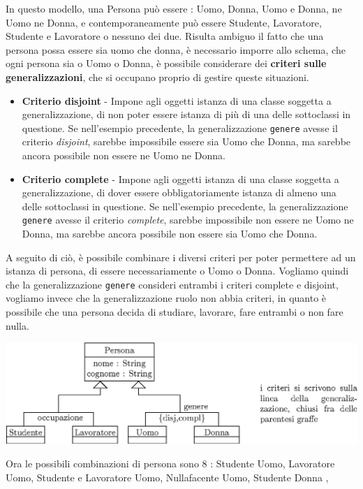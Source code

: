 \documentclass[12pt, letterpaper]{article}
\newcommand{\code}[1]{\colorbox{light-gray}{\texttt{#1}}}
\begin{document}
In questo modello, una Persona può essere : Uomo, Donna, Uomo e Donna, ne Uomo ne Donna, e contemporaneamente 
può essere Studente, Lavoratore, Studente e Lavoratore o nessuno dei due. Risulta ambiguo il fatto che una persona 
possa essere sia uomo che donna, è necessario imporre allo schema, che ogni persona sia o Uomo o Donna, è possibile 
considerare dei \textbf{criteri sulle generalizzazioni}, che si occupano proprio di gestire queste situazioni.\begin{itemize}
    \item \textbf{Criterio disjoint} - Impone agli oggetti istanza di una classe soggetta a generalizzazione, di non poter 
    essere istanza di più di una delle sottoclassi in questione. Se nell'esempio precedente, la generalizzazione 
    \code{genere} avesse il criterio \textit{disjoint}, sarebbe impossibile essere sia Uomo che Donna, ma 
    sarebbe ancora possibile non essere ne Uomo ne Donna.
    \item \textbf{Criterio complete} - Impone agli oggetti istanza di una classe soggetta a generalizzazione,
    di dover essere obbligatoriamente istanza di almeno una delle sottoclassi in questione. Se nell'esempio precedente, la generalizzazione 
    \code{genere} avesse il criterio \textit{complete}, sarebbe impossibile non essere ne Uomo ne Donna, ma     
    sarebbe ancora possibile non essere sia Uomo che Donna.
\end{itemize}
A seguito di ciò, è possibile combinare i diversi criteri per poter permettere ad un istanza di persona, di essere 
necessariamente o Uomo o Donna. Vogliamo quindi che la generalizzazione \code{genere} consideri entrambi i criteri 
complete e disjoint, vogliamo invece che la generalizzazione ruolo non abbia criteri, in quanto è possibile che una 
persona decida di studiare, lavorare, fare entrambi o non fare nulla. \begin{center}
    \includegraphics[width=1\textwidth ]{images/isa3.eps}
\end{center} 
Ora le possibili combinazioni di persona sono 8 : Studente Uomo,
Lavoratore Uomo, 
Studente e Lavoratore Uomo,
Nullafacente Uomo,
Studente Donna ,
\end{document}
